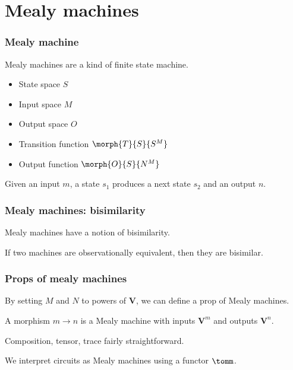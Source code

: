 \section{Mealy machines}

\begin{frame}
    \frametitle{Mealy machine}

    Mealy machines are a kind of \alert{finite state machine}.

    \pause
    \begin{itemize}
        \item \alert{State space} $S$ \pause
        \item \alert{Input space} $M$ \pause
        \item \alert{Output space} $O$ \pause
        \item \alert{Transition function} $\morph{T}{S}{S^M}$ \pause
        \item \alert{Output function} $\morph{O}{S}{N^M}$ \pause
    \end{itemize}

    Given an input $m$, a state $s_1$ produces a \alert{next state} $s_2$ and an \alert{output} $n$.

    \pause

    \begin{center}
        
    \end{center}

\end{frame}

\begin{frame}
    \frametitle{Mealy machines: bisimilarity}

    Mealy machines have a notion of \alert{bisimilarity}.

    If two machines are \alert{observationally equivalent}, then they are bisimilar.

\end{frame}

\begin{frame}
    \frametitle{Props of mealy machines}

    By setting $M$ and $N$ to powers of $\textbf{V}$, we can define a prop of Mealy machines.

    \pause

    A morphism $m \to n$ is a Mealy machine with inputs $\textbf{V}^m$ and outputs $\textbf{V}^n$.
    
    \pause

    Composition, tensor, trace fairly straightforward.

    \pause

    We interpret circuits as Mealy machines using a functor $\tomm$.

\end{frame}

